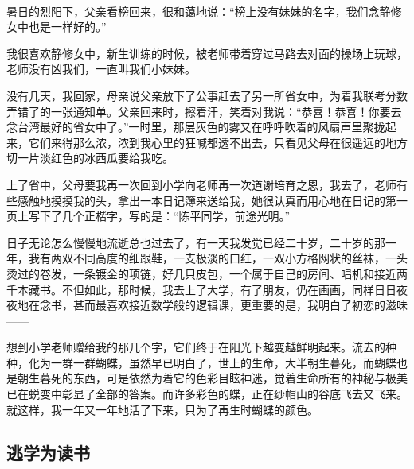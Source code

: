 \par  
\par 暑日的烈阳下，父亲看榜回来，很和蔼地说：“榜上没有妹妹的名字，我们念静修女中也是一样好的。”
\par 我很喜欢静修女中，新生训练的时候，被老师带着穿过马路去对面的操场上玩球，老师没有凶我们，一直叫我们小妹妹。
\par 没有几天，我回家，母亲说父亲放下了公事赶去了另一所省女中，为着我联考分数弄错了的一张通知单。父亲回来时，擦着汗，笑着对我说：“恭喜！恭喜！你要去念台湾最好的省女中了。”一时里，那层灰色的雾又在呼呼吹着的风扇声里聚拢起来，它们来得那么浓，浓到我心里的狂喊都透不出去，只看见父母在很遥远的地方切一片淡红色的冰西瓜要给我吃。
\par 上了省中，父母要我再一次回到小学向老师再一次道谢培育之恩，我去了，老师有些感触地摸摸我的头，拿出一本日记簿来送给我，她很认真而用心地在日记的第一页上写下了几个正楷字，写的是：“陈平同学，前途光明。”
\par 日子无论怎么慢慢地流逝总也过去了，有一天我发觉已经二十岁，二十岁的那一年，我有两双不同高度的细跟鞋，一支极淡的口红，一双小方格网状的丝袜，一头烫过的卷发，一条镀金的项链，好几只皮包，一个属于自己的房间、唱机和接近两千本藏书。不但如此，那时候，我去上了大学，有了朋友，仍在画画，同样日日夜夜地在念书，甚而最喜欢接近数学般的逻辑课，更重要的是，我明白了初恋的滋味——
\par 想到小学老师赠给我的那几个字，它们终于在阳光下越变越鲜明起来。流去的种种，化为一群一群蝴蝶，虽然早已明白了，世上的生命，大半朝生暮死，而蝴蝶也是朝生暮死的东西，可是依然为着它的色彩目眩神迷，觉着生命所有的神秘与极美已在蜕变中彰显了全部的答案。而许多彩色的蝶，正在纱帽山的谷底飞去又飞来。就这样，我一年又一年地活了下来，只为了再生时蝴蝶的颜色。





\subsection{逃学为读书}


